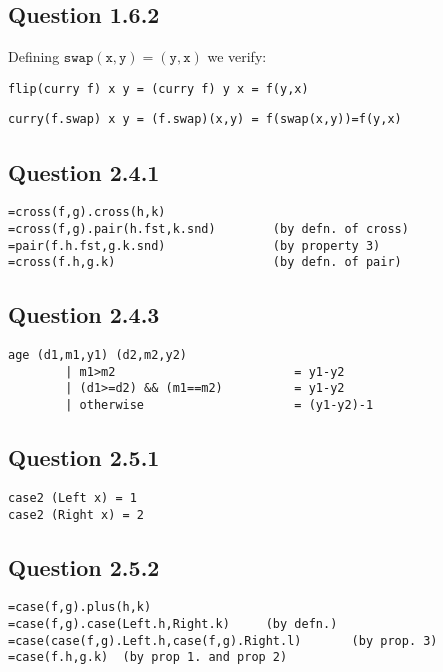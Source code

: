 \documentclass[10pt]{report}
\begin{document}
\subsection*{Question 1.6.2}

Defining $\mathtt{swap(x,y)=(y,x)}$ we verify:

\begin{verbatim}
flip(curry f) x y = (curry f) y x = f(y,x)
\end{verbatim}

\begin{verbatim}
curry(f.swap) x y = (f.swap)(x,y) = f(swap(x,y))=f(y,x)
\end{verbatim}

\subsection*{Question 2.4.1}

\begin{verbatim}
=cross(f,g).cross(h,k)
=cross(f,g).pair(h.fst,k.snd)        (by defn. of cross)
=pair(f.h.fst,g.k.snd)               (by property 3)
=cross(f.h,g.k)                      (by defn. of pair)
\end{verbatim}

\subsection*{Question 2.4.3}

\begin{verbatim}
age (d1,m1,y1) (d2,m2,y2) 
        | m1>m2                         = y1-y2
        | (d1>=d2) && (m1==m2)          = y1-y2
        | otherwise                     = (y1-y2)-1
\end{verbatim}

\subsection*{Question 2.5.1}
\begin{verbatim}
case2 (Left x) = 1
case2 (Right x) = 2
\end{verbatim}

\subsection*{Question 2.5.2}

\begin{verbatim}
=case(f,g).plus(h,k)
=case(f,g).case(Left.h,Right.k)		(by defn.)
=case(case(f,g).Left.h,case(f,g).Right.l)		(by prop. 3)
=case(f.h,g.k)	(by prop 1. and prop 2)
\end{verbatim}
\end{document}
